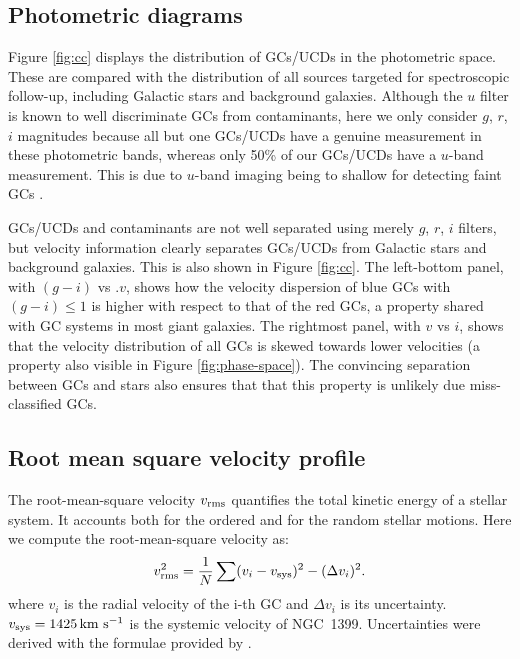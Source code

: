 \documentclass[useAMS,usenatbib]{mn2e}
\newcommand{\kms}{\mbox{\,km~s$^{-1}$}}
\begin{document}
\subsection{Photometric diagrams}


Figure \ref{fig:cc} displays the distribution of GCs/UCDs in the photometric space. These are compared with the distribution of all sources targeted for spectroscopic follow-up, including Galactic stars and background galaxies. Although the $u$ filter is known to well discriminate GCs from contaminants, here we only consider $g$, $r$, $i$ magnitudes because all but one GCs/UCDs have a genuine measurement in these photometric bands, whereas only 50\% of our GCs/UCDs have a $u$-band measurement. This is due to $u$-band imaging being to shallow for detecting faint GCs \citep{DAbrusco16}.

GCs/UCDs and contaminants are not well separated using merely $g$, $r$, $i$ filters, but velocity information clearly separates GCs/UCDs from Galactic stars and background galaxies. This is also shown in Figure \ref{fig:cc}. The left-bottom panel, with $(g-i)$ vs .$v$, shows how the velocity dispersion of blue GCs with $(g-i) \le 1$ is higher with respect to that of the red GCs, a property shared with GC systems in most giant galaxies. The rightmost panel, with $v$ vs $i$, shows that the velocity distribution of all GCs is skewed towards lower velocities (a property also visible in Figure \ref{fig:phase-space}). The convincing separation between GCs and stars also ensures that that this property is unlikely due miss-classified GCs. 

\subsection{Root mean square velocity profile}
The root-mean-square velocity $v_{\rm rms}$ quantifies the total kinetic energy of a stellar system. It accounts both for the ordered and for the random stellar motions. Here we compute the root-mean-square velocity as:
\begin{equation}
v_{\rm rms}^2 = \frac{1}{N}  \sum (v_i - v_{\rm sys})^2 - (\Delta v_i)^2 .
\label{eq:sigma}
\end{equation}
where $v_i$ is the radial velocity of the i-th GC and $\Delta v_i$ is its uncertainty. $v_{\rm sys}=1425 \kms$ is the systemic velocity of NGC~1399. Uncertainties were derived with the formulae provided by \citet{Danese}. 
\end{document}

